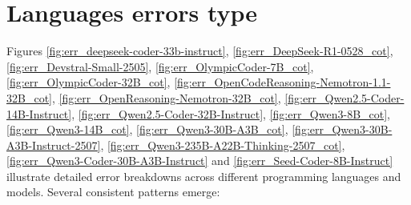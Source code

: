 \section{Languages errors type}

Figures \ref{fig:err_deepseek-coder-33b-instruct}, \ref{fig:err_DeepSeek-R1-0528_cot}, \ref{fig:err_Devstral-Small-2505}, \ref{fig:err_OlympicCoder-7B_cot}, \ref{fig:err_OlympicCoder-32B_cot}, \ref{fig:err_OpenCodeReasoning-Nemotron-1.1-32B_cot}, \ref{fig:err_OpenReasoning-Nemotron-32B_cot}, \ref{fig:err_Qwen2.5-Coder-14B-Instruct}, \ref{fig:err_Qwen2.5-Coder-32B-Instruct}, \ref{fig:err_Qwen3-8B_cot}, 
\ref{fig:err_Qwen3-14B_cot},  
\ref{fig:err_Qwen3-30B-A3B_cot}, 
\ref{fig:err_Qwen3-30B-A3B-Instruct-2507}, \ref{fig:err_Qwen3-235B-A22B-Thinking-2507_cot}, \ref{fig:err_Qwen3-Coder-30B-A3B-Instruct}  and \ref{fig:err_Seed-Coder-8B-Instruct} illustrate 
detailed error breakdowns across different programming languages and models.
Several consistent patterns emerge:
